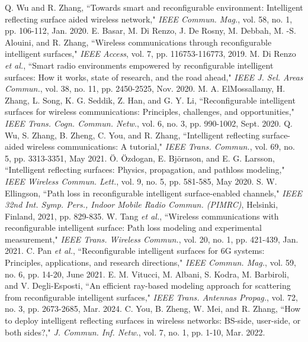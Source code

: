 \documentclass{IEEEoj}
\begin{document}
\begin{thebibliography}{00}
	 Q. Wu and R. Zhang, “Towards smart and reconfigurable environment: Intelligent reflecting surface aided wireless network," \textit{IEEE Commun. Mag.}, vol. 58, no. 1, pp. 106-112, Jan. 2020.
	 E. Basar, M. Di Renzo, J. De Rosny, M. Debbah, M. -S. Alouini, and R. Zhang, “Wireless communications through reconfigurable intelligent surfaces," \textit{IEEE Access}, vol. 7, pp. 116753-116773, 2019.
	 M. Di Renzo \textit{et al.}, “Smart radio environments empowered by reconfigurable intelligent surfaces: How it works, state of research, and the road ahead," \textit{IEEE J. Sel. Areas Commun.}, vol. 38, no. 11, pp. 2450-2525, Nov. 2020.	
	 M. A. ElMossallamy, H. Zhang, L. Song, K. G. Seddik, Z. Han, and G. Y. Li, “Reconfigurable intelligent surfaces for wireless communications: Principles, challenges, and opportunities," \textit{IEEE Trans. Cogn. Commun. Netw.}, vol. 6, no. 3, pp. 990-1002, Sept. 2020.
	 Q. Wu, S. Zhang, B. Zheng, C. You, and R. Zhang, “Intelligent reflecting surface-aided wireless communications: A tutorial," \textit{IEEE Trans. Commun.}, vol. 69, no. 5, pp. 3313-3351, May 2021.
	 Ö. Özdogan, E. Björnson, and E. G. Larsson, “Intelligent reflecting surfaces: Physics, propagation, and pathloss modeling," \textit{IEEE Wireless Commun. Lett.}, vol. 9, no. 5, pp. 581-585, May 2020.
	 S. W. Ellingson, “Path loss in reconfigurable intelligent surface-enabled channels," \textit{IEEE 32nd Int. Symp. Pers., Indoor Mobile Radio Commun. (PIMRC)}, Helsinki, Finland, 2021, pp. 829-835.
	 W. Tang \textit{et al.}, “Wireless communications with reconfigurable intelligent surface: Path loss modeling and experimental measurement," \textit{IEEE Trans. Wireless Commun.}, vol. 20, no. 1, pp. 421-439, Jan. 2021.
	 C. Pan \textit{et al.}, “Reconfigurable intelligent surfaces for 6G systems: Principles, applications, and research directions," \textit{IEEE Commun. Mag.}, vol. 59, no. 6, pp. 14-20, June 2021.
	 E. M. Vitucci, M. Albani, S. Kodra, M. Barbiroli, and V. Degli-Esposti, “An efficient ray-based modeling approach for scattering from reconfigurable intelligent surfaces," \textit{IEEE Trans. Antennas Propag.}, vol. 72, no. 3, pp. 2673-2685, Mar. 2024.	
	 C. You, B. Zheng, W. Mei, and R. Zhang, “How to deploy intelligent reflecting surfaces in wireless networks: BS-side, user-side, or both sides?," \textit{J. Commun. Inf. Netw.}, vol. 7, no. 1, pp. 1-10, Mar. 2022.

\end{thebibliography}
\end{document}
